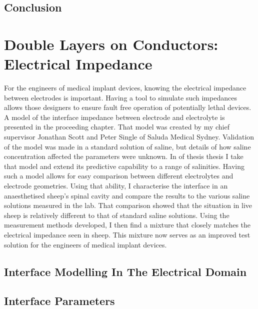    \chapter{Conclusion}
     \label{chap:part1_conclusion}
     



\part{Double Layers on Conductors: Electrical Impedance}
  \label{part:doubleLayersOnConductors}

  For the engineers of medical implant devices, knowing the electrical impedance between electrodes is important.
  Having a tool to simulate such impedances allows those designers to ensure fault free operation of potentially lethal devices.
  A model of the interface impedance between electrode and electrolyte is presented in the proceeding chapter.
  That model was created by my chief supervisor Jonathan Scott and Peter Single of Saluda Medical Sydney.
  Validation of the model was made in a standard solution of saline, but details of how saline concentration affected the parameters were unknown.
  In \cref{part:doubleLayersOnConductors} of thesis thesis I take that model and extend its predictive capability to a range of salinities.
  Having such a model allows for easy comparison between different electrolytes and electrode geometries.
  Using that ability, I characterise the interface in an anaesthetised sheep's spinal cavity and compare the results to the various saline solutions measured in the lab.
  That comparison showed that the situation in live sheep is relatively different to that of standard saline solutions.
  Using the measurement methods developed, I then find a mixture that closely matches the electrical impedance seen in sheep.
  This mixture now serves as an improved test solution for the engineers of medical implant devices.

  \chapter{Interface Modelling In The Electrical Domain}
    \label{chap:theInterfaceModel}
    

  \chapter{Interface Parameters}
    \label{chap:interfaceParameters}
    

